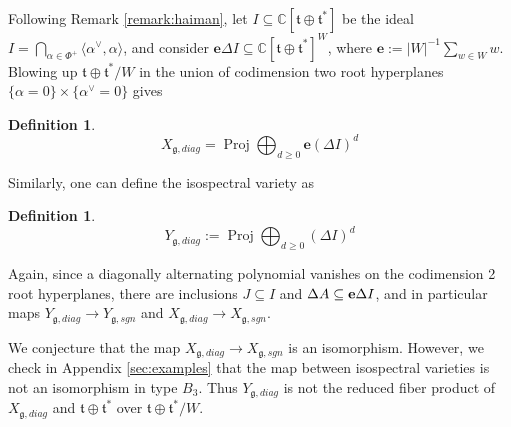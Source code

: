 \documentclass{amsart}
\numberwithin{equation}{section}
\theoremstyle{definition}
\newtheorem{definition}[lemma]{Definition}%
\DeclareMathOperator{\Proj}{\mathrm{Proj}}
\newcommand{\fg}{\mathfrak{g}}
\newcommand{\ft}{\mathfrak{t}}
\newcommand{\C}{{\mathbb C}}
\newcommand{\e}{\mathbf{e}}
\begin{document}
Following Remark \ref{remark:haiman}, let $I\subseteq \C[\ft\oplus \ft^*]$ be the ideal $I=\bigcap_{\alpha\in \Phi^+} \langle \alpha^\vee, \alpha\rangle$, and consider $\e\Delta I\subseteq \C[\ft\oplus \ft^*]^W$, where $\e:=|W|^{-1}\sum_{w\in W}w$. Blowing up $\ft\oplus \ft^*/W$ in the union of codimension two root hyperplanes $\{\alpha=0\}\times \{\alpha^\vee=0\}$ gives
\begin{definition}
    $$X_{\fg,diag}=\Proj \bigoplus_{d\geq 0} \e(\Delta I)^d$$ 
\end{definition}
Similarly, one can define the isospectral variety as 
\begin{definition}
$$Y_{\fg,diag}:=\Proj\bigoplus_{d\geq 0} (\Delta I)^d$$
\end{definition}
Again, since a diagonally alternating polynomial vanishes on the codimension 2 root hyperplanes, there are inclusions $J\subseteq I$ and $\Delta A\subseteq {\bf e} \Delta I$, and in particular maps $Y_{\fg,diag}\to Y_{\fg,sgn}$ and $X_{\fg,diag}\to X_{\fg,sgn}$.

We conjecture that the map $X_{\fg,diag}\to X_{\fg,sgn}$ is an isomorphism. However, we check in Appendix \ref{sec:examples} that the map between isospectral varieties is not an isomorphism in type $B_3$. Thus $Y_{\fg,diag}$ is not the reduced fiber product of $X_{\fg,diag}$ and $\ft\oplus\ft^*$ over $\ft\oplus\ft^*/W$.
\end{document}
